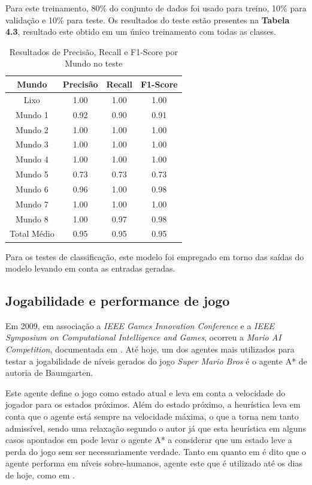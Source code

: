 Para este treinamento, 80\% do conjunto de dados foi usado para treino, 10\% para validação e 10\% para teste. Os resultados do teste estão presentes na \textbf{Tabela 4.3}, resultado este obtido em um único treinamento com todas as classes.

\begin{table}[h]
    \centering
    \begin{tabular}{|c|c|c|c|}
        \hline
        Mundo & Precisão & Recall & F1-Score \\
        \hline
        Lixo & 1.00 & 1.00 & 1.00 \\
        Mundo 1 & 0.92 & 0.90 & 0.91 \\
        Mundo 2 & 1.00 & 1.00 & 1.00 \\
        Mundo 3 & 1.00 & 1.00 & 1.00 \\
        Mundo 4 & 1.00 & 1.00 & 1.00 \\
        Mundo 5 & 0.73 & 0.73 & 0.73 \\
        Mundo 6 & 0.96 & 1.00 & 0.98 \\
        Mundo 7 & 1.00 & 1.00 & 1.00 \\
        Mundo 8 & 1.00 & 0.97 & 0.98 \\
        Total Médio & 0.95 & 0.95 & 0.95 \\
        \hline
    \end{tabular}
    \caption{Resultados de Precisão, Recall e F1-Score por Mundo no teste}
    \label{tab:resultados}
\end{table}

Para os testes de classificação, este modelo foi empregado em torno das saídas do modelo levando em conta as entradas geradas.

\subsection{Jogabilidade e performance de jogo}

Em 2009, em associação a \textit{IEEE Games Innovation Conference} e a \textit{IEEE Symposium on Computational Intelligence and Games}, ocorreu a \textit{Mario AI Competition}, documentada em \cite{marioAI}. Até hoje, um dos agentes mais utilizados para testar a jogabilidade de níveis gerados do jogo \textit{Super Mario Bros} é o agente A* de autoria de Baumgarten.

Este agente define o jogo como estado atual e leva em conta a velocidade do jogador para os estados próximos. Além do estado próximo, a heurística leva em conta que o agente está sempre na velocidade máxima, o que a torna nem tanto admissível, sendo uma relaxação segundo o autor já que esta heurística em alguns casos apontados em \cite{marioAI} pode levar o agente A* a considerar que um estado leve a perda do jogo sem ser necessariamente verdade. Tanto em \cite{marioGAN} quanto em \cite{marioAI} é dito que o agente performa em níveis sobre-humanos, agente este que é utilizado até os dias de hoje, como em \cite{mariogpt}.

